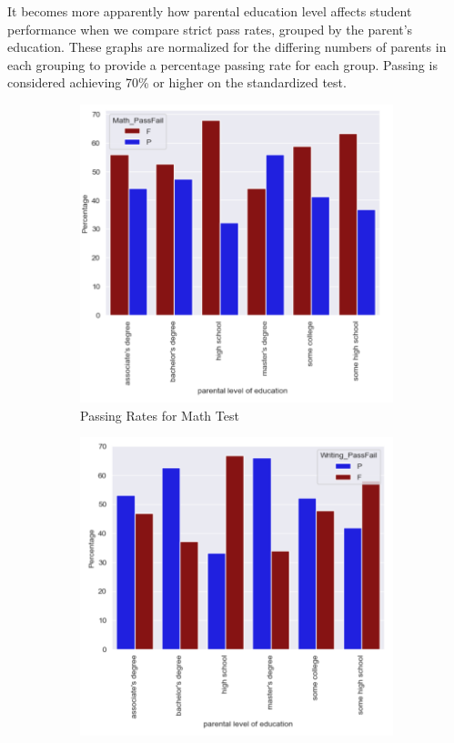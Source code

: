 \documentclass[doc]{apa6} %
\begin{document}
It becomes more apparently how parental education level affects student performance when we compare strict pass rates, grouped by the parent's education. These graphs are normalized for the differing numbers of parents in each grouping to provide a percentage passing rate for each group.  Passing is considered achieving 70\% or higher on the standardized test.

\begin{figure}[H]
    \centering
    \caption{Correlations of Parent Education to Student Pass Rates}
    \begin{subfigure}[b]{0.28\textwidth}
    \includegraphics[width=\linewidth]{MathPFBarGraph.png}
    \caption{Passing Rates for Math Test}
    \label{fig:math}
    \end{subfigure}
    \begin{subfigure}[b]{0.28\textwidth}
    \includegraphics[width=\linewidth]{WritingPFBarGraph.png}

\end{subfigure}
\end{figure}
\end{document}

